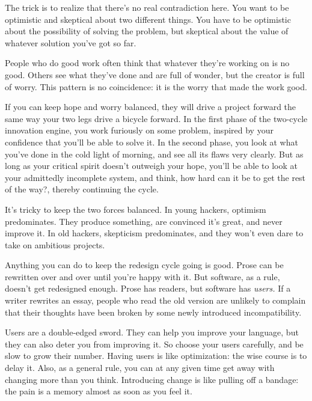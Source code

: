 The trick is to realize that
                  there's no real contradiction here. You want to be optimistic
                  and skeptical about two different things. You have to be
                  optimistic about the possibility of solving the problem, but
                  skeptical about the value of whatever solution you've got so
                  far.

People who do good work often think that
                  whatever they're working on is no good. Others see what
                  they've done and are full of wonder, but the creator is full
                  of worry. This pattern is no coincidence: it is the worry that
                  made the work good.

If you can keep hope and worry
                  balanced, they will drive a project forward the same way your
                  two legs drive a bicycle forward. In the first phase of the
                  two-cycle innovation engine, you work furiously on some
                  problem, inspired by your confidence that you'll be able to
                  solve it. In the second phase, you look at what you've done in
                  the cold light of morning, and see all its flaws very clearly.
                  But as long as your critical spirit doesn't outweigh your
                  hope, you'll be able to look at your admittedly incomplete
                  system, and think, how hard can it be to get the rest of the
                  way?, thereby continuing the cycle.

It's tricky to
                  keep the two forces balanced. In young hackers, optimism
                  predominates. They produce something, are convinced it's
                  great, and never improve it. In old hackers, skepticism
                  predominates, and they won't even dare to take on ambitious
                  projects.

Anything you can do to keep the redesign
                  cycle going is good. Prose can be rewritten over and over
                  until you're happy with it. But software, as a rule, doesn't
                  get redesigned enough. Prose has readers, but software has
                  \emph{users.} If a writer rewrites an essay, people who read
                  the old version are unlikely to complain that their thoughts
                  have been broken by some newly introduced incompatibility.

Users
                  are a double-edged sword. They can help you improve your
                  language, but they can also deter you from improving it. So
                  choose your users carefully, and be slow to grow their number.
                  Having users is like optimization: the wise course is to delay
                  it. Also, as a general rule, you can at any given time get
                  away with changing more than you think. Introducing change is
                  like pulling off a bandage: the pain is a memory almost as
                  soon as you feel it.

